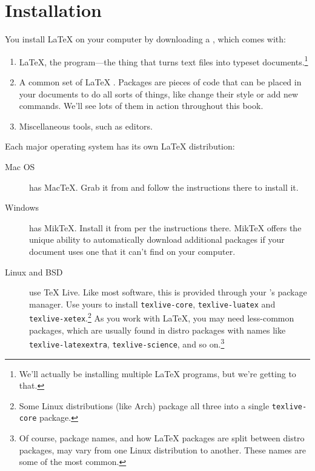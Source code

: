 \chapter{Installation}
\label{installation}

You install \LaTeX{} on your computer by downloading a ,
which comes with:
\begin{enumerate}
\item \LaTeX, the program---the thing that turns text files into typeset
    documents.\footnote{We'll actually be installing multiple \LaTeX{} programs,
    but we're getting to that.}
\item A common set of \LaTeX{} .
    Packages are pieces of code that can be placed in your documents to
    do all sorts of things, like change their style or add new commands.
    We'll see lots of them in action throughout this book.
\item Miscellaneous tools, such as editors.
\end{enumerate}
Each major operating system has its own \LaTeX{} distribution:
\begin{description}
\item[Mac OS] has Mac\TeX. Grab it from 
    and follow the instructions there to install it.

\item[Windows] has Mik\TeX.
    Install it from 
    per the instructions there.
    Mik\TeX{} offers the unique ability to automatically download
    additional packages if your document uses one that it can't find
    on your computer.

\item[Linux and BSD] use \TeX{} Live.
    Like most software, this is provided through your
    's package manager.
    Use yours to install \texttt{texlive-\allowbreak core},
    \texttt{texlive-\allowbreak luatex}
    and \texttt{texlive-\allowbreak xetex}.\punckern\footnote{%
    Some Linux distributions (like Arch) package all three into a
    single \texttt{texlive-core} package.}
    As you work with \LaTeX, you may need less-common packages,
    which are usually found in distro packages with names like
    \texttt{texlive-latexextra}, \texttt{texlive-science},
    and so on.\punckern\footnote{Of
    course, package names, and how \LaTeX{} packages are split between
    distro packages, may vary from one Linux distribution to another.
    These names are some of the most common.}
\end{description}

